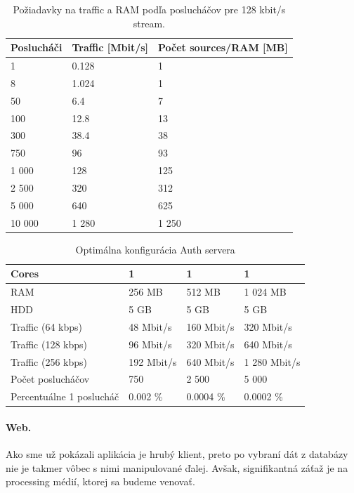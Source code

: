 \documentclass[11pt]{article}
\begin{document}
\begin{table}[htp]
\centering
\begin{tabular}{|l||l|l|}
\hline
	Poslucháči & Traffic [Mbit/s] & Počet sources/RAM [MB]\\
\hline
	1      & 0.128 & 1\\
\hline
	8      & 1.024 & 1\\
\hline
	50     & 6.4 & 7\\
\hline
	100    & 12.8 & 13\\
\hline
	300    & 38.4 & 38\\
\hline
	750    & 96 & 93\\
\hline
	1 000  & 128 & 125\\
\hline
	2 500  & 320 & 312 \\
\hline
	5 000  & 640 & 625\\
\hline
	10 000 & 1 280 & 1 250\\
\hline
\end{tabular}
\caption{Požiadavky na traffic a RAM podľa poslucháčov pre 128 kbit/s stream. }
\label{kon2}
\end{table}







\begin{table}[htp]
\centering
\begin{tabular}{|l|l|l|l|}
\hline
	Cores & 1 & 1 & 1\\
\hline
	RAM & 256 MB & 512 MB & 1 024 MB\\
\hline
	HDD & 5 GB & 5 GB & 5 GB\\
\hline
	Traffic (64 kbps) & 48 Mbit/s & 160 Mbit/s & 320 Mbit/s\\
\hline
	Traffic (128 kbps) & 96 Mbit/s & 320 Mbit/s & 640 Mbit/s\\
\hline
	Traffic (256 kbps) & 192 Mbit/s & 640 Mbit/s & 1 280 Mbit/s\\
\hline
	Počet poslucháčov & 750 & 2 500 & 5 000 \\
\hline
	Percentuálne 1 poslucháč & 0.002 \% & 0.0004 \% & 0.0002 \%\\
\hline
\end{tabular}
\caption{Optimálna konfigurácia Auth servera}
\label{konf2}
\end{table}





\paragraph{Web.} Ako sme už pokázali aplikácia je hrubý klient, preto po vybraní dát z databázy nie je takmer vôbec s nimi manipulované ďalej. Avšak, signifikantná záťaž je na processing médií, ktorej sa budeme venovať. 
\end{document}
